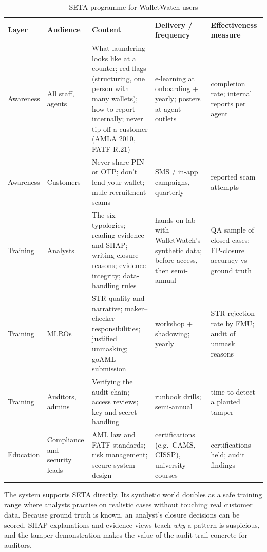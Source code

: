 \documentclass[conference,10pt]{IEEEtran}
\newcommand{\tbl}{\scriptsize\renewcommand{\arraystretch}{1.12}}
\begin{document}
\begin{table}[t]
\caption{SETA programme for WalletWatch users}\label{tab:seta}
\centering\tbl
\begin{tabularx}{\textwidth}{@{}p{1.25cm}p{2.0cm}Xp{3.6cm}p{3.4cm}@{}}
\toprule
Layer & Audience & Content & Delivery / frequency & Effectiveness measure \\ \midrule
Awareness & All staff, agents & What laundering looks like at a counter; red flags (structuring, one person with many wallets); how to report internally; never tip off a customer (AMLA 2010, FATF R.21) & e-learning at onboarding + yearly; posters at agent outlets & completion rate; internal reports per agent \\
Awareness & Customers & Never share PIN or OTP; don't lend your wallet; mule recruitment scams & SMS / in-app campaigns, quarterly & reported scam attempts \\
Training & Analysts & The six typologies; reading evidence and SHAP; writing closure reasons; evidence integrity; data-handling rules & hands-on lab with WalletWatch's synthetic data; before access, then semi-annual & QA sample of closed cases; FP-closure accuracy vs ground truth \\
Training & MLROs & STR quality and narrative; maker--checker responsibilities; justified unmasking; goAML submission & workshop + shadowing; yearly & STR rejection rate by FMU; audit of unmask reasons \\
Training & Auditors, admins & Verifying the audit chain; access reviews; key and secret handling & runbook drills; semi-annual & time to detect a planted tamper \\
Education & Compliance and security leads & AML law and FATF standards; risk management; secure system design & certifications (e.g.\ CAMS, CISSP), university courses & certifications held; audit findings \\
\bottomrule
\end{tabularx}
\end{table}

The system supports SETA directly. Its synthetic world doubles as a safe training range where
analysts practise on realistic cases without touching real customer data. Because ground truth is
known, an analyst's closure decisions can be scored. SHAP explanations and evidence views teach
\emph{why} a pattern is suspicious, and the tamper demonstration makes the value of the audit trail
concrete for auditors.

\end{document}
